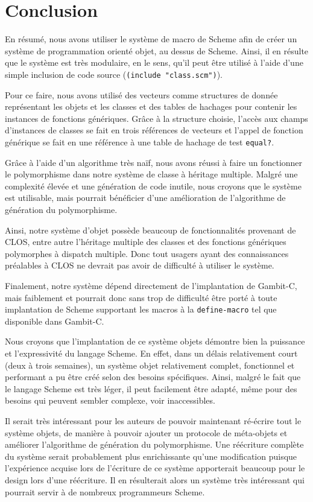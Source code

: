 
\section{Conclusion}
  En résumé, nous avons utiliser le système de macro de Scheme afin de
  créer un système de programmation orienté objet, au dessus de
  Scheme. Ainsi, il en résulte que le système est très modulaire, en
  le sens, qu'il peut être utilisé à l'aide d'une simple inclusion de
  code source (\texttt{(include "class.scm")}). 

  Pour ce faire, nous avons utilisé des vecteurs comme structures de
  donnée représentant les objets et les classes et des tables de
  hachages pour contenir les instances de fonctions génériques. Grâce
  à la structure choisie, l'accès aux champs d'instances de classes se
  fait en trois références de vecteurs et l'appel de fonction
  générique se fait en une référence à une table de hachage de test
  \texttt{equal?}.

  Grâce à l'aide d'un algorithme très naïf, nous avons réussi à faire
  un fonctionner le polymorphisme dans notre système de classe à
  héritage multiple. Malgré une complexité élevée et une génération de
  code inutile, nous croyons que le système est utilisable, mais
  pourrait bénéficier d'une amélioration de l'algorithme de génération
  du polymorphisme.

  Ainsi, notre système d'objet possède beaucoup de fonctionnalités
  provenant de CLOS, entre autre l'héritage multiple des classes et
  des fonctions génériques polymorphes à \og dispatch \fg
  multiple. Donc tout usagers ayant des connaissances préalables à
  CLOS ne devrait pas avoir de difficulté à utiliser le système.

  Finalement, notre système dépend directement de l'implantation de
  Gambit-C, mais faiblement et pourrait donc sans trop de difficulté
  être porté à toute implantation de Scheme supportant les macros à la
  \texttt{define-macro} tel que disponible dans Gambit-C.

  Nous croyons que l'implantation de ce système objets démontre bien
  la puissance et l'expressivité du langage Scheme. En effet, dans un
  délais relativement court (deux à trois semaines), un système objet
  relativement complet, fonctionnel et performant a pu être créé selon
  des besoins spécifiques. Ainsi, malgré le fait que le langage
  Scheme est très léger, il peut facilement être adapté, même pour des
  besoins qui peuvent sembler complexe, voir inaccessibles.

  Il serait très intéressant pour les auteurs de pouvoir maintenant
  ré-écrire tout le système objets, de manière à pouvoir ajouter un
  protocole de méta-objets et améliorer l'algorithme de génération du
  polymorphisme. Une réécriture complète du système serait
  probablement plus enrichissante qu'une modification puisque
  l'expérience acquise lors de l'écriture de ce système apporterait
  beaucoup pour le design lors d'une réécriture. Il en résulterait
  alors un système très intéressant qui pourrait servir à de nombreux
  programmeurs Scheme.

